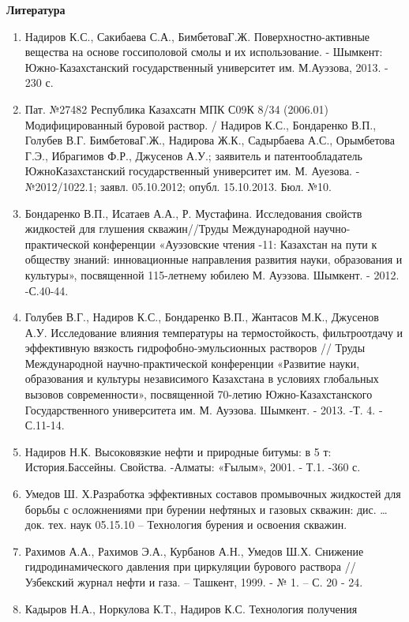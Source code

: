 {\bfseries Литература}

\begin{enumerate}
\def\labelenumi{\arabic{enumi}.}
\item
  Надиров К.С., Сакибаева С.А., БимбетоваГ.Ж. Поверхностно-активные
  вещества на основе госсиполовой смолы и их использование. - Шымкент:
  Южно-Казахстанский государственный университет им. М.Ауэзова, 2013. -
  230 с.
\item
  Пат. №27482 Республика Казахсатн МПК С09К 8/34 (2006.01)
  Модифицированный буровой раствор. / Надиров К.С., Бондаренко В.П.,
  Голубев В.Г. БимбетоваГ.Ж., Надирова Ж.К., Садырбаева А.С., Орымбетова
  Г.Э., Ибрагимов Ф.Р., Джусенов А.У.; заявитель и патентообладатель
  ЮжноКазахстанский государственный университет им. М. Ауезова.
  -№2012/1022.1; заявл. 05.10.2012; опубл. 15.10.2013. Бюл. №10.
\item
  Бондаренко В.П., Исатаев А.А., Р. Мустафина. Исследования свойств
  жидкостей для глушения скважин//Труды Международной
  научно-практической конференции «Ауэзовские чтения -11: Казахстан на
  пути к обществу знаний: инновационные направления развития науки,
  образования и культуры», посвященной 115-летнему юбилею М. Ауэзова.
  Шымкент. - 2012. -С.40-44.
\item
  Голубев В.Г., Надиров К.С., Бондаренко В.П., Жантасов М.К., Джусенов
  А.У. Исследование влияния температуры на термостойкость, фильтроотдачу
  и эффективную вязкость гидрофобно-эмульсионных растворов // Труды
  Международной научно-практической конференции «Развитие науки,
  образования и культуры независимого Казахстана в условиях глобальных
  вызовов современности», посвященной 70-летию Южно-Казахстанского
  Государственного университета им. М. Ауэзова. Шымкент. - 2013. -Т. 4.
  - С.11-14.
\item
  Надиров Н.К. Высоковязкие нефти и природные битумы: в 5 т:
  История.Бассейны. Свойства. -Алматы: «Ғылым», 2001. - Т.1. -360 с.
\item
  Умедов Ш. Х.Разработка эффективных составов промывочных жидкостей для
  борьбы с осложнениями при бурении нефтяных и газовых скважин: дис.
  \ldots{} док. тех. наук 05.15.10 -- Технология бурения и освоения
  скважин.
\item
  Рахимов А.А., Рахимов Э.А., Курбанов А.Н., Умедов Ш.Х. Снижение
  гидродинамического давления при циркуляции бурового раствора //
  Узбекский журнал нефти и газа. -- Ташкент, 1999. - № 1. -- С. 20 - 24.
\item
  Кадыров Н.А., Норкулова К.Т., Надиров К.С. Технология получения

\end{enumerate}
